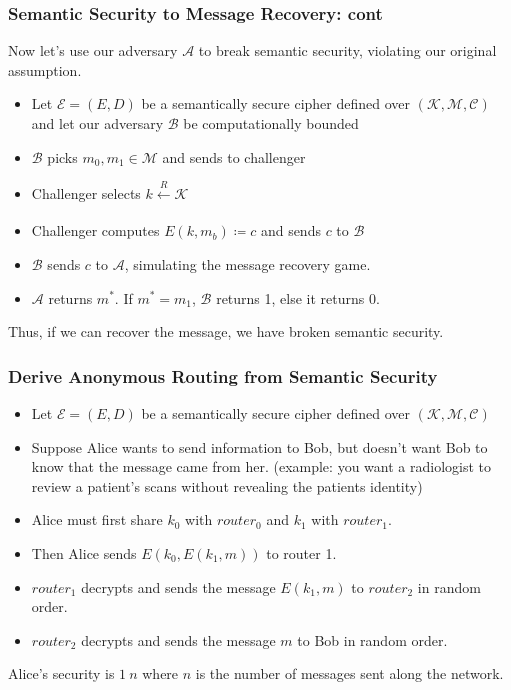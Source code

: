 \documentclass{beamer}
\begin{document}
\begin{frame}
\frametitle{Semantic Security to Message Recovery: cont}
    Now let's use our adversary \(\mathcal{A}\) to break semantic security, violating our original assumption.
    \begin{itemize}
        \item Let \(\mathcal{E} = (E, D)\) be a semantically secure cipher defined over \((\mathcal{K}, \mathcal{M}, \mathcal{C})\) and let our adversary \(\mathcal{B}\) be computationally bounded \pause
        \item \(\mathcal{B}\) picks \(m_0, m_1 \in \mathcal{M}\) and sends to challenger \pause
        \item Challenger selects \(k \xleftarrow[]{R} \mathcal{K}\) \pause
        \item Challenger computes \(E(k, m_b) \coloneqq c \) and sends \(c\) to \(\mathcal{B}\) \pause
        \item \(\mathcal{B}\) sends \(c\) to \(\mathcal{A}\), simulating the message recovery game. \pause
        \item \(\mathcal{A}\) returns \(m^{*}\). If \(m^{*} = m_1\), \(\mathcal{B}\) returns 1, else it returns 0. \pause
    \end{itemize} 
    Thus, if we can recover the message, we have broken semantic security.
\end{frame}

\begin{frame}
\frametitle{Derive Anonymous Routing from Semantic Security}
    \begin{itemize}
        \item Let \(\mathcal{E} = (E, D)\) be a semantically secure cipher defined over \((\mathcal{K}, \mathcal{M}, \mathcal{C})\) \pause
        \item Suppose Alice wants to send information to Bob, but doesn't want Bob to know that the message came from her. \pause (example: you want a radiologist to review a patient's scans without revealing the patients identity) \pause
        \item Alice must first share \(k_0\) with \(router_0\) and \(k_1\) with \(router_1\). \pause
        \item Then Alice sends \(E(k_0, E(k_1, m))\) to router 1. \pause
        \item \(router_1\) decrypts and sends the message \(E(k_1, m)\) to \(router_2\) in random order. \pause
        \item \(router_2\) decrypts and sends the message \(m\) to Bob in random order.\pause
    \end{itemize} 
    
    Alice's security is \(1 \ n\) where \(n\) is the number of messages sent along the network.

\end{frame}

 
\end{document}
